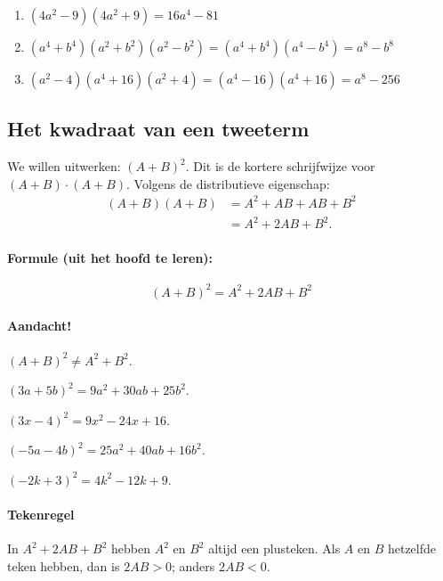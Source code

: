 \documentclass{bis}
\begin{document}
\begin{solution}
\begin{enumerate}
  \item \((4a^2-9)(4a^2+9)=16a^4-81\)
  \item \((a^4+b^4)(a^2+b^2)(a^2-b^2)=(a^4+b^4)(a^4-b^4)=a^8-b^8\)
  \item \((a^2-4)(a^4+16)(a^2+4)=(a^4-16)(a^4+16)=a^8-256\)
\end{enumerate}
\end{solution}

\subsection{Het kwadraat van een tweeterm}
We willen uitwerken: \((A+B)^2\). Dit is de kortere schrijfwijze voor \((A+B)\cdot(A+B)\). Volgens de distributieve eigenschap:
\begin{align*}
  (A+B)(A+B) & =A^2+AB+AB+B^2 \\
             & =A^2+2AB+B^2.
\end{align*}

\paragraph*{Formule (uit het hoofd te leren):}
\[
\boxed{(A+B)^2=A^2+2AB+B^2}
\]
\paragraph*{Aandacht!} \((A+B)^2\neq A^2+B^2\).

\begin{voorbeeld}
\((3a+5b)^2=9a^2+30ab+25b^2\).
\end{voorbeeld}

\begin{voorbeeld}
\((3x-4)^2=9x^2-24x+16\).
\end{voorbeeld}

\begin{voorbeeld}
\(({-}5a-4b)^2=25a^2+40ab+16b^2\).
\end{voorbeeld}

\begin{voorbeeld}
\(({-}2k+3)^2=4k^2-12k+9\).
\end{voorbeeld}

\paragraph*{Tekenregel}
In \(A^2+2AB+B^2\) hebben \(A^2\) en \(B^2\) altijd een plusteken. Als \(A\) en \(B\) hetzelfde teken hebben, dan is \(2AB>0\); anders \(2AB<0\).
\end{document}
